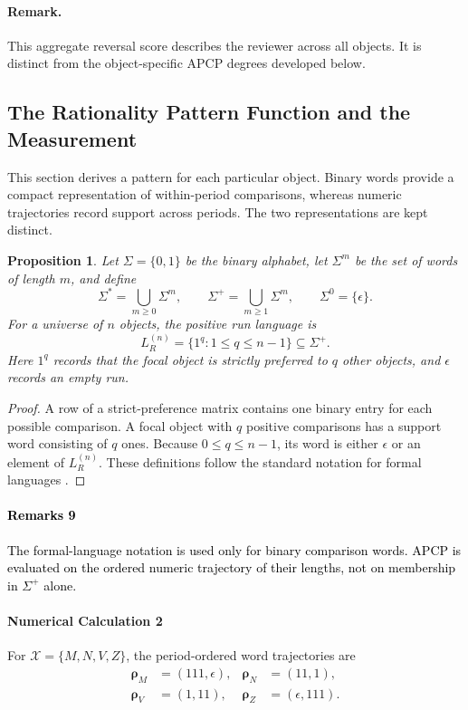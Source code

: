 \documentclass[conference]{IEEEtran}
\theoremstyle{plain}
\newtheorem{proposition}{Proposition}
\theoremstyle{definition}
\theoremstyle{remark}
\begin{document}
		\paragraph{Remark.} This aggregate reversal score describes the reviewer across all objects. It is distinct from the object-specific APCP degrees developed below.
	\subsection{The Rationality Pattern Function and the Measurement}
	This section derives a pattern for each particular object. Binary words provide a compact representation of within-period comparisons, whereas numeric trajectories record support across periods. The two representations are kept distinct.
	\begin{proposition}
		Let $\Sigma=\{0,1\}$ be the binary alphabet, let $\Sigma^m$ be the set of words of length $m$, and define
		\begin{equation}
			\Sigma^*=\bigcup_{m\geq0}\Sigma^m,
			\qquad
			\Sigma^+=\bigcup_{m\geq1}\Sigma^m,
			\qquad
			\Sigma^0=\{\epsilon\}.
		\end{equation}
		For a universe of $n$ objects, the positive run language is
		\begin{equation}
			L_R^{(n)}=\{1^q:1\leq q\leq n-1\}\subseteq\Sigma^+.
		\end{equation}
		Here $1^q$ records that the focal object is strictly preferred to $q$ other objects, and $\epsilon$ records an empty run.
	\end{proposition}
	\begin{proof}
		A row of a strict-preference matrix contains one binary entry for each possible comparison. A focal object with $q$ positive comparisons has a support word consisting of $q$ ones. Because $0\leq q\leq n-1$, its word is either $\epsilon$ or an element of $L_R^{(n)}$. These definitions follow the standard notation for formal languages \citep{hopcroft2001introduction}.
	\end{proof}
	\textcolor{black}{\paragraph{Remarks 9} The formal-language notation is used only for binary comparison words. APCP is evaluated on the ordered numeric trajectory of their lengths, not on membership in $\Sigma^+$ alone.}
	\paragraph{Numerical Calculation 2} For $\mathcal X=\{M,N,V,Z\}$, the period-ordered word trajectories are
	\begin{equation}
		\begin{aligned}
		\boldsymbol\rho_M&=(111,\epsilon),&
		\boldsymbol\rho_N&=(11,1),\\
		\boldsymbol\rho_V&=(1,11),&
		\boldsymbol\rho_Z&=(\epsilon,111).
		\end{aligned}
	\end{equation}
\end{document}
